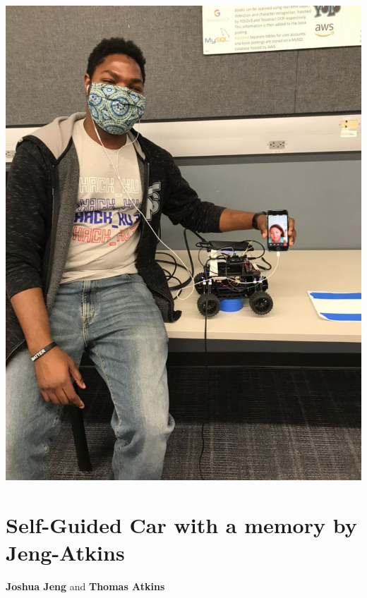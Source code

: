 \documentclass[11pt]{article}
\begin{document}
\begin{enumerate}
\begin{center}
\includegraphics[width=.9\linewidth]{./anticol_2.jpg}
\end{center}
\end{enumerate}


\section{Self-Guided Car with a memory by Jeng-Atkins}
\label{sec:org8bff800}
\textbf{Joshua Jeng} and \textbf{Thomas Atkins}
\end{document}
